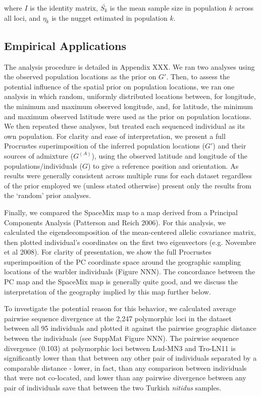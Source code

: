 \documentclass[12pt]{article}
\newcommand{\admixsource}[1]{{$G^{(A)}$}}
\begin{document}
 where $I$ is the identity matrix, $\bar{S_k}$ is the mean sample size in population $k$ across all loci, and $\eta_k$ is the nugget estimated in population $k$.

\subsection*{Empirical Applications}
The analysis procedure is detailed in Appendix XXX.  We ran two analyses using the observed population locations as the prior on $G'$.  Then, to assess the potential influence of the spatial prior on population locations, we ran one analysis in which random, uniformly distributed locations between, for longitude, the minimum and maximum observed longitude, and, for latitude, the minimum and maximum observed latitude were used as the prior on population locations.  We then repeated these analyses, but treated each sequenced individual as its own population.  For clarity and ease of interpretation, we present a full Procrustes superimposition of the inferred population locations ($G'$) and their sources of admixture (\admixsource{}), using the observed latitude and longitude of the populations/individuals ($G$) to give a reference position and orientation.  As results were generally consistent across multiple runs for each dataset regardless of the prior employed we (unless stated otherwise) present only the results from the `random' prior analyses.

Finally, we compared the SpaceMix map to a map derived from a Principal Components Analysis (Patterson and Reich 2006).  For this analysis, we calculated the eigendecomposition of the mean-centered allelic covariance matrix, then plotted individual's coordinates on the first two eigenvectors (e.g. Novembre et al 2008).  For clarity of presentation, we show the full Procrustes superimposition of the PC coordinate space around the geographic sampling locations of the warbler individuals (Figure NNN).  The concordance between the PC map and the SpaceMix map is generally quite good, and we discuss the interpretation of the geography implied by this map further below.

To investigate the potential reason for this behavior, we calculated average pairwise sequence divergence at the 2,247 polymorphic loci in the dataset between all 95 individuals and plotted it against the pairwise geographic distance between the individuals (see SuppMat Figure NNN).  The pairwise sequence divergence (0.103) at polymorphic loci between Lud-MN3 and Tro-LN11 is significantly lower than that between any other pair of individuals separated by a comparable distance - lower, in fact, than any comparison between individuals that were not co-located, and lower than any pairwise divergence between any pair of individuals save that between the two Turkish \textit{nitidus} samples. 
\end{document}
